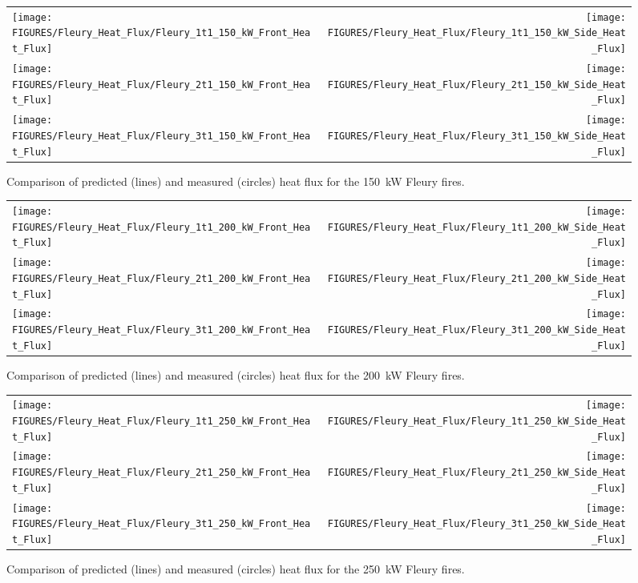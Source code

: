 \begin{figure}[p]
\begin{tabular*}{\textwidth}{l@{\extracolsep{\fill}}r}
\texttt{[image: FIGURES/Fleury\_Heat\_Flux/Fleury\_1t1\_150\_kW\_Front\_Heat\_Flux]} &
\texttt{[image: FIGURES/Fleury\_Heat\_Flux/Fleury\_1t1\_150\_kW\_Side\_Heat\_Flux]} \\
\texttt{[image: FIGURES/Fleury\_Heat\_Flux/Fleury\_2t1\_150\_kW\_Front\_Heat\_Flux]} &
\texttt{[image: FIGURES/Fleury\_Heat\_Flux/Fleury\_2t1\_150\_kW\_Side\_Heat\_Flux]} \\
\texttt{[image: FIGURES/Fleury\_Heat\_Flux/Fleury\_3t1\_150\_kW\_Front\_Heat\_Flux]} &
\texttt{[image: FIGURES/Fleury\_Heat\_Flux/Fleury\_3t1\_150\_kW\_Side\_Heat\_Flux]}
\end{tabular*}
\label{Fleury_Heat_Flux_150_kW}
\caption[Fleury Heat Flux, 150 kW fires.]
{Comparison of predicted (lines) and measured (circles) heat flux for the 150~kW Fleury fires.}
\end{figure}

\begin{figure}[p]
\begin{tabular*}{\textwidth}{l@{\extracolsep{\fill}}r}
\texttt{[image: FIGURES/Fleury\_Heat\_Flux/Fleury\_1t1\_200\_kW\_Front\_Heat\_Flux]} &
\texttt{[image: FIGURES/Fleury\_Heat\_Flux/Fleury\_1t1\_200\_kW\_Side\_Heat\_Flux]} \\
\texttt{[image: FIGURES/Fleury\_Heat\_Flux/Fleury\_2t1\_200\_kW\_Front\_Heat\_Flux]} &
\texttt{[image: FIGURES/Fleury\_Heat\_Flux/Fleury\_2t1\_200\_kW\_Side\_Heat\_Flux]} \\
\texttt{[image: FIGURES/Fleury\_Heat\_Flux/Fleury\_3t1\_200\_kW\_Front\_Heat\_Flux]} &
\texttt{[image: FIGURES/Fleury\_Heat\_Flux/Fleury\_3t1\_200\_kW\_Side\_Heat\_Flux]}
\end{tabular*}
\label{Fleury_Heat_Flux_200_kW}
\caption[Fleury Heat Flux, 200 kW fires.]
{Comparison of predicted (lines) and measured (circles) heat flux for the 200~kW Fleury fires.}
\end{figure}

\begin{figure}[p]
\begin{tabular*}{\textwidth}{l@{\extracolsep{\fill}}r}
\texttt{[image: FIGURES/Fleury\_Heat\_Flux/Fleury\_1t1\_250\_kW\_Front\_Heat\_Flux]} &
\texttt{[image: FIGURES/Fleury\_Heat\_Flux/Fleury\_1t1\_250\_kW\_Side\_Heat\_Flux]} \\
\texttt{[image: FIGURES/Fleury\_Heat\_Flux/Fleury\_2t1\_250\_kW\_Front\_Heat\_Flux]} &
\texttt{[image: FIGURES/Fleury\_Heat\_Flux/Fleury\_2t1\_250\_kW\_Side\_Heat\_Flux]} \\
\texttt{[image: FIGURES/Fleury\_Heat\_Flux/Fleury\_3t1\_250\_kW\_Front\_Heat\_Flux]} &
\texttt{[image: FIGURES/Fleury\_Heat\_Flux/Fleury\_3t1\_250\_kW\_Side\_Heat\_Flux]}
\end{tabular*}
\label{Fleury_Heat_Flux_250_kW}
\caption[Fleury Heat Flux, 250 kW fires.]
{Comparison of predicted (lines) and measured (circles) heat flux for the 250~kW Fleury fires.}
\end{figure}

